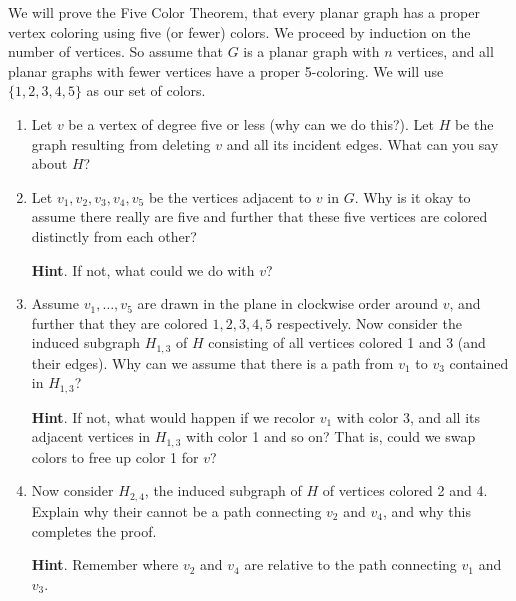\documentclass{book}
\begin{document}
\setcounter{cpjt}{39}
\addtocounter{cpjt}{-1}
\begin{activity}\label{activity-32}
\hypertarget{p-352}{}%
We will prove the Five Color Theorem, that every planar graph has a proper vertex coloring using five (or fewer) colors.  We proceed by induction on the number of vertices.  So assume that \(G\) is a planar graph with \(n\) vertices, and all planar graphs with fewer vertices have a proper 5-coloring.  We will use \(\{1,2,3,4,5\}\) as our set of colors.%
\begin{enumerate}[font=\bfseries,label=(\alph*),ref=\alph*]
\item\label{task-48} \hypertarget{p-353}{}%
Let \(v\) be a vertex of degree five or less (why can we do this?).  Let \(H\) be the graph resulting from deleting \(v\) and all its incident edges.  What can you say about \(H\)?%
\item\label{task-49} \hypertarget{p-354}{}%
Let \(v_1, v_2, v_3, v_4, v_5\) be the vertices adjacent to \(v\) in \(G\).  Why is it okay to assume there really are five and further that these five vertices are colored distinctly from each other?%
\par\smallskip%
\noindent\textbf{Hint}.\hypertarget{hint-12}{}\quad%
\hypertarget{p-355}{}%
If not, what could we do with \(v\)?%
\item\label{task-50} \hypertarget{p-356}{}%
Assume \(v_1, \ldots, v_5\) are drawn in the plane in clockwise order around \(v\), and further that they are colored \(1,2,3,4,5\) respectively.  Now consider the induced subgraph \(H_{1,3}\) of \(H\) consisting of all vertices colored 1 and 3 (and their edges).  Why can we assume that there is a path from \(v_1\) to \(v_3\) contained in \(H_{1,3}\)?%
\par\smallskip%
\noindent\textbf{Hint}.\hypertarget{hint-13}{}\quad%
\hypertarget{p-357}{}%
If not, what would happen if we recolor \(v_1\) with color 3, and all its adjacent vertices in \(H_{1,3}\) with color 1 and so on?  That is, could we swap colors to free up color 1 for \(v\)?%
\item\label{task-51} \hypertarget{p-358}{}%
Now consider \(H_{2,4}\), the induced subgraph of \(H\) of vertices colored 2 and 4.  Explain why their cannot be a path connecting \(v_2\) and \(v_4\), and why this completes the proof.%
\par\smallskip%
\noindent\textbf{Hint}.\hypertarget{hint-14}{}\quad%
\hypertarget{p-359}{}%
Remember where \(v_2\) and \(v_4\) are relative to the path connecting \(v_1\) and \(v_3\).%
\end{enumerate}
\end{activity}

\clearpage
\end{document}
